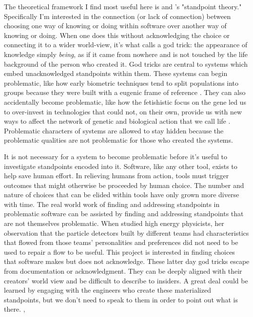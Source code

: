 \documentclass[a4paper,man,natbib]{apa6}
\begin{document}
   The theoretical framework I find most useful here is \citet{Harding1992-od} and \citet{Haraway1988-nh}'s "standpoint theory." Specifically I'm interested in the connection (or lack of connection) between choosing one way of knowing or doing within software over another way of knowing or doing. When one does this without acknowledging the choice or connecting it to a wider world-view, it's what \citet{Haraway1988-nh} calls a god trick: the appearance of knowledge simply \textit{being}, as if it came from nowhere and is not touched by the life background of the person who created it. God tricks are central to systems which embed unacknowledged standpoints within them. These systems can begin problematic, like how early biometric techniques tend to split populations into groups because they were built with a eugenic frame of reference \citet{Subramaniam2014-wg}. They can also accidentally become problematic, like how the fetishistic focus on the gene led us to over-invest in technologies that could not, on their own, provide us with new ways to affect the network of genetic and biological action that we call life \citet{Harraway1997-va,Reardon2017-bo}. Problematic characters of systems are allowed to stay hidden because the problematic qualities are not problematic for those who created the systems. 

   It is not necessary for a system to become problematic before it's useful to investigate standpoints encoded into it. Software, like any other tool, exists to help save human effort. In relieving humans from action, tools must trigger outcomes that might otherwise be proceeded by human choice. The number and nature of choices that can be elided within tools have only grown more diverse with time. The real world work of finding and addressing standpoints in problematic software can be assisted by finding and addressing standpoints that are not themselves problematic. When \citet{Traweek2009-uu} studied high energy physicists, her observation that the particle detectors built by different teams had characteristics that flowed from those teams' personalities and preferences did not need to be used to repair a flow to be useful. This project is interested in finding choices that software makes but does not acknowledge. These latter day god tricks escape from documentation or acknowledgment. They can be deeply aligned with their creators' world view and be difficult to describe to insiders. A great deal could be learned by engaging with the engineers who create these materialized standpoints, but we don't need to speak to them in order to point out what is there.
,
  
\end{document}
